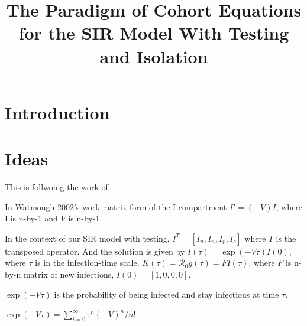 \documentclass[12pt]{article}
\title{The Paradigm of Cohort Equations for the SIR  Model With Testing and Isolation}
\newcommand{\Rnot}{\ensuremath{\mathcal{R}_0}}
\theoremstyle{definition} %
\begin{document}
\maketitle
\linenumbers




\section{Introduction}

\section{Ideas}
This is follwoing the work of \cite{champredon2018equivalence}.

In Watmough 2002's work matrix form of the I compartment $I'=(-V)I$, where I is n-by-1 and $V$ is n-by-1.

In the context of our SIR model with testing, $I^T=[I_u,I_n,I_p,I_c]$ where $T$ is the transposed operator.
And the solution is given by $I(\tau) = \exp(-V\tau) I(0)$, where $\tau$ is in the infection-time scale.
$K(\tau)=\Rnot g(\tau)= F I(\tau)$,
where $F$ is n-by-n matrix of new infections, $I(0)=[1,0,0,0]$.

$\exp(-V\tau)$ is the probability of being infected and stay infectious at time $\tau$.

$\exp(-V\tau)=\sum_{i=0}^\infty \tau^n (-V)^n/n!$.






\end{document}
